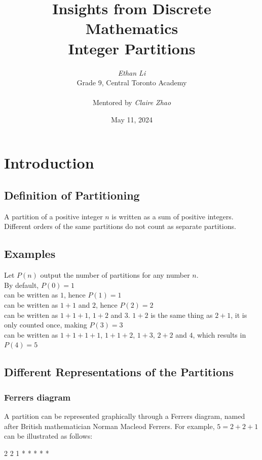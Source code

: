 \documentclass{article}
\title{\vspace{-2.0cm}\textbf{Insights from Discrete Mathematics \\
\LARGE Integer Partitions}}
\author{\textit{Ethan Li} \\ \small Grade 9, Central Toronto Academy \\ \\ \small Mentored by \normalsize \textit{Claire Zhao}}
\date{May 11, 2024}
\begin{document}
\maketitle

\section{Introduction}

\subsection{Definition of Partitioning}
A partition of a positive integer \(n\) is written as a sum of positive integers. Different orders of the same partitions do not count as separate partitions.

\subsection{Examples}
Let \(P(n)\) output the number of partitions for any number \(n\).\\

\noindent By default, \(P(0)=1\)\\

 can be written as \(1\), hence \(P(1)=1\)\\

 can be written as \(1+1\) and \(2\), hence \(P(2)=2\)\\

 can be written as \(1+1+1\), \(1+2\) and \(3\). \(1+2\) is the same thing as \(2+1\), it is only counted once, making \(P(3) = 3\)\\

 can be written as \(1+1+1+1\), \(1+1+2\), \(1+3\), \(2+2\) and \(4\), which results in \(P(4)=5\)

\subsection{Different Representations of the Partitions}
\subsubsection{Ferrers diagram}

A partition can be represented graphically through a Ferrers diagram, named after British mathematician Norman Macleod Ferrers. For example, \(5=2+2+1\) can be illustrated as follows:\\
\begin{center}
\begin{verbbox}
2 2 1
* * *
* *
\\
\end{verbbox}
\theverbbox
\end{center}
\end{document}
